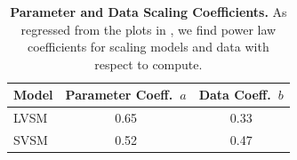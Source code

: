 \begin{table}[h]
\footnotesize
\centering
\begin{tabular}{lcc}
\toprule
\textbf{Model} & Parameter Coeff.\ $a$ & Data Coeff.\ $b$ \\
\midrule
LVSM & 0.65 & 0.33 \\
SVSM & 0.52 & 0.47 \\
\bottomrule
\end{tabular}
\caption{\textbf{Parameter and Data Scaling Coefficients.} As regressed from the plots in , we find power law coefficients for scaling models and data with respect to compute.
\vspace{-1\baselineskip}
}
\label{tab:opt-model-table}
\end{table}
